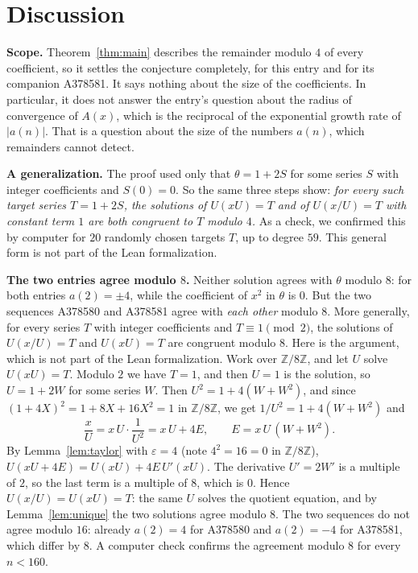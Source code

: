 \documentclass[11pt,a4paper]{article}
\theoremstyle{definition}
\theoremstyle{remark}
\newcommand{\Z}{\mathbb{Z}}
\newcommand{\para}[1]{\par\medskip\noindent\textbf{#1}\enspace}
\begin{document}
\section{Discussion}\label{sec:discussion}

\para{Scope.} Theorem~\ref{thm:main} describes the remainder modulo $4$ of every coefficient, so it settles the
conjecture completely, for this entry and for its companion A378581. It says nothing about the size of the
coefficients. In particular, it does not answer the entry's question about the radius of convergence of
$A(x)$, which is the reciprocal of the exponential growth rate of $|a(n)|$. That is a question about the size of
the numbers $a(n)$, which remainders cannot detect.

\para{A generalization.} The proof used only that $\theta=1+2S$ for some series $S$ with integer coefficients and
$S(0)=0$. So the same three steps show: \emph{for every such target series $T=1+2S$, the solutions of $U(xU)=T$ and of
$U(x/U)=T$ with constant term $1$ are both congruent to $T$ modulo $4$.} As a check, we confirmed this by computer for
$20$ randomly chosen targets $T$, up to degree $59$. This general form is not part of the Lean formalization.

\para{The two entries agree modulo $8$.} Neither solution agrees with $\theta$ modulo $8$: for both entries
$a(2)=\pm4$, while the coefficient of $x^2$ in $\theta$ is $0$. But the two sequences A378580 and A378581 agree with
\emph{each other} modulo $8$. More generally, for every series $T$ with integer coefficients and $T\equiv1\pmod 2$, the
solutions of $U(x/U)=T$ and $U(xU)=T$ are congruent modulo $8$. Here is the argument, which is not part of the Lean
formalization. Work over $\Z/8\Z$, and let $U$ solve $U(xU)=T$. Modulo $2$ we have $T=1$, and then $U=1$ is the
solution, so $U=1+2W$ for some series $W$. Then $U^2=1+4(W+W^2)$, and since $(1+4X)^2=1+8X+16X^2=1$ in $\Z/8\Z$, we get
$1/U^2=1+4(W+W^2)$ and
\[
\frac xU=x\,U\cdot\frac1{U^2}=x\,U+4E,\qquad E=x\,U\,(W+W^2).
\]
By Lemma~\ref{lem:taylor} with $\varepsilon=4$ (note $4^2=16=0$ in $\Z/8\Z$),
$U(xU+4E)=U(xU)+4E\,U'(xU)$. The derivative $U'=2W'$ is a multiple of $2$, so the last term is a multiple of $8$, which
is $0$. Hence $U(x/U)=U(xU)=T$: the same $U$ solves the quotient equation, and by Lemma~\ref{lem:unique} the two
solutions agree modulo $8$. The two sequences do not agree modulo $16$: already $a(2)=4$ for A378580 and $a(2)=-4$ for
A378581, which differ by $8$. A computer check confirms the agreement modulo $8$ for every $n<160$.
\end{document}
